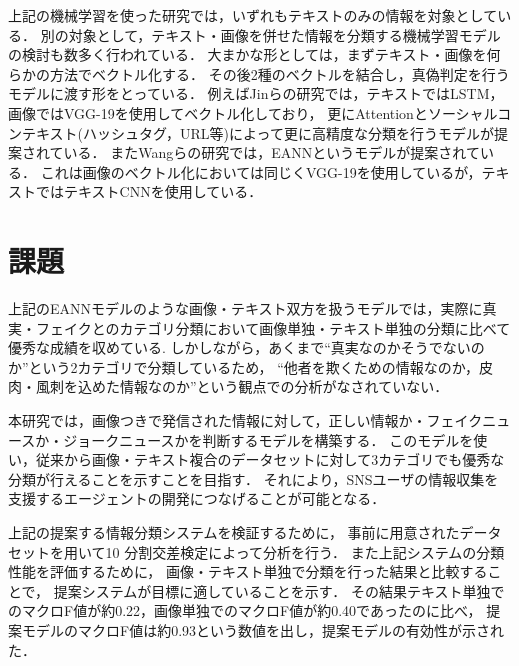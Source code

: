 上記の機械学習を使った研究では，いずれもテキストのみの情報を対象としている．
別の対象として，テキスト・画像を併せた情報を分類する機械学習モデルの検討も数多く行われている．
大まかな形としては，まずテキスト・画像を何らかの方法でベクトル化する．
その後2種のベクトルを結合し，真偽判定を行うモデルに渡す形をとっている．
例えばJinらの研究\cite{jin}では，テキストではLSTM，画像ではVGG-19を使用してベクトル化しており，
更にAttentionとソーシャルコンテキスト(ハッシュタグ，URL等)によって更に高精度な分類を行うモデルが提案されている．
またWangらの研究\cite{eann}では，EANNというモデルが提案されている．
これは画像のベクトル化においては同じくVGG-19を使用しているが，テキストではテキストCNNを使用している．

\section{課題}
上記のEANNモデルのような画像・テキスト双方を扱うモデルでは，実際に真実・フェイクとのカテゴリ分類において画像単独・テキスト単独の分類に比べて優秀な成績を収めている\cite{eann}.\@
しかしながら，あくまで``真実なのかそうでないのか''という2カテゴリで分類しているため，
``他者を欺くための情報なのか，皮肉・風刺を込めた情報なのか''という観点での分析がなされていない．

本研究では，画像つきで発信された情報に対して，正しい情報か・フェイクニュースか・ジョークニュースかを判断するモデルを構築する．
このモデルを使い，従来から画像・テキスト複合のデータセットに対して3カテゴリでも優秀な分類が行えることを示すことを目指す．
それにより，SNSユーザの情報収集を支援するエージェントの開発につなげることが可能となる．

上記の提案する情報分類システムを検証するために，
事前に用意されたデータセットを用いて10 分割交差検定によって分析を行う．
また上記システムの分類性能を評価するために，
画像・テキスト単独で分類を行った結果と比較することで，
提案システムが目標に適していることを示す．
その結果テキスト単独でのマクロF値が約0.22，画像単独でのマクロF値が約0.40であったのに比べ，
提案モデルのマクロF値は約0.93という数値を出し，提案モデルの有効性が示された．

% 
